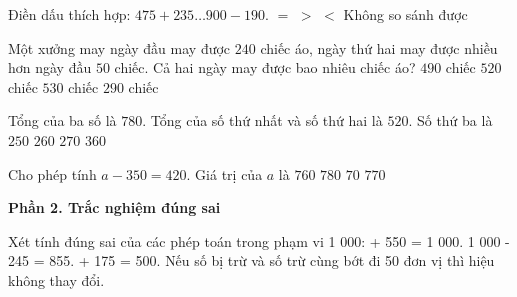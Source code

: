 \begin{ex} %
Điền dấu thích hợp: $475 + 235 \dots 900 - 190$.
\choice
{\True $=$}
{$>$}
{$<$}
{Không so sánh được}
\end{ex}

\begin{ex} %
Một xưởng may ngày đầu may được $240$ chiếc áo, ngày thứ hai may được nhiều hơn ngày đầu $50$ chiếc. Cả hai ngày may được bao nhiêu chiếc áo?
\choice
{$490$ chiếc}
{$520$ chiếc}
{\True $530$ chiếc}
{$290$ chiếc}
\end{ex}

\begin{ex} %
Tổng của ba số là $780$. Tổng của số thứ nhất và số thứ hai là $520$. Số thứ ba là
\choice
{$250$}
{\True $260$}
{$270$}
{$360$}
\end{ex}

\begin{ex} %
Cho phép tính $a - 350 = 420$. Giá trị của $a$ là
\choice
{$760$}
{$780$}
{$70$}
{\True $770$}
\end{ex}

\textbf{Phần 2. Trắc nghiệm đúng sai}

\begin{ex} %
Xét tính đúng sai của các phép toán trong phạm vi 1 000:
\choiceTF
{ + 550 = 1 000.}
{1 000 - 245 = 855.}
{ + 175 = 500.}
{\True Nếu số bị trừ và số trừ cùng bớt đi 50 đơn vị thì hiệu không thay đổi.}
\end{ex}

